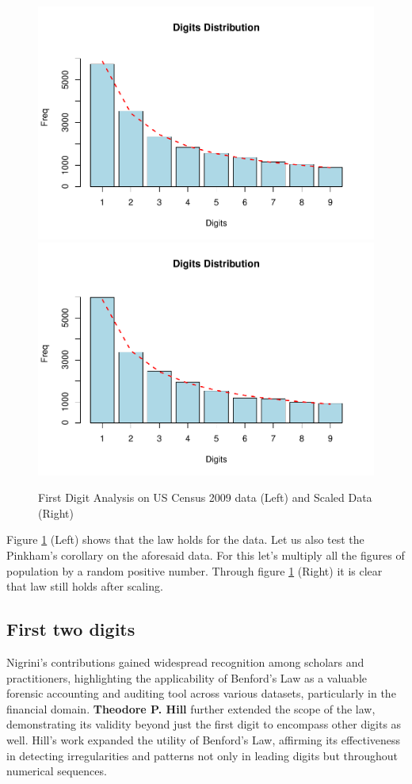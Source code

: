\documentclass[
]{book}
\begin{document}
\begin{figure}

{\centering \includegraphics[width=0.45\linewidth]{DauR_files/figure-latex/census-1} \includegraphics[width=0.45\linewidth]{DauR_files/figure-latex/census-2} 

}

\caption{First Digit Analysis on US Census 2009 data (Left) and Scaled Data (Right)}\label{fig:census}
\end{figure}

Figure \ref{fig:census} (Left) shows that the law holds for the data. Let us also test the Pinkham's corollary on the aforesaid data. For this let's multiply all the figures of population by a random positive number. Through figure \ref{fig:census} (Right) it is clear that law still holds after scaling.

\hypertarget{first-two-digits}{%
\subsection{First two digits}\label{first-two-digits}}

Nigrini's contributions gained widespread recognition among scholars and practitioners, highlighting the applicability of Benford's Law as a valuable forensic accounting and auditing tool across various datasets, particularly in the financial domain. \textbf{Theodore P. Hill} further \citep{t_hill} extended the scope of the law, demonstrating its validity beyond just the first digit to encompass other digits as well. Hill's work expanded the utility of Benford's Law, affirming its effectiveness in detecting irregularities and patterns not only in leading digits but throughout numerical sequences.
\end{document}
